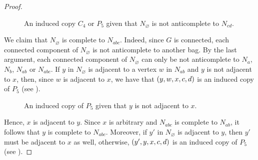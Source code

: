 \begin{proof}
\begin{figure}[htb!]
        \caption{An induced copy $C_4$ or $P_5$ given that $N_\varnothing$ is
            not anticomplete to $N_{cd}$.}
        \label{fig:3_bag_4}
    \end{figure}

    We claim that $N_\varnothing$ is complete to $N_{abc}$. Indeed, since $G$ is
    connected, each connected component of $N_\varnothing$ is not anticomplete
    to another bag. By the last argument, each connected component of
    $N_\varnothing$ can only be not anticomplete to $N_{a}$, $N_{b}$, $N_{ab}$
    or $N_{abc}$. If $y$ in $N_\varnothing$ is adjacent to a vertex $w$ in
    $N_{ab}$ and $y$ is not adjacent to $x$, then, since $w$ is adjacent to $x$,
    we have that $\left(y,w,x,c,d\right)$ is an induced copy of $P_5$ (see
    ).

    \begin{figure}[htb!]
        \centering
        \caption{An induced copy of $P_5$ given that $y$ is not adjacent to
        $x$.}
        \label{fig:3_bag_5}
    \end{figure}

    Hence, $x$ is adjacent to $y$. Since $x$ is arbitrary and $N_{abc}$ is
    complete to $N_{ab}$, it follows that $y$ is complete to $N_{abc}$.
    Moreover, if $y'$ in $N_\varnothing$ is adjacent to $y$, then $y'$ must be
    adjacent to $x$ as well, otherwise, $\left(y',y,x,c,d\right)$ is an induced copy of
    $P_5$ (see ).


\end{proof}
